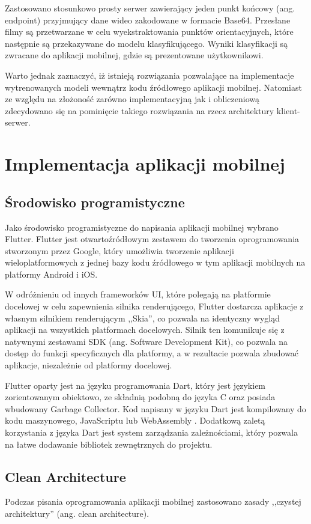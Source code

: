 Zastosowano stosunkowo prosty serwer zawierający jeden punkt końcowy (ang. endpoint) przyjmujący dane wideo zakodowane w formacie Base64.
Przesłane filmy są przetwarzane w celu wyekstraktowania punktów orientacyjnych, które następnie są przekazywane do modelu klasyfikującego. Wyniki klasyfikacji są zwracane do aplikacji mobilnej, gdzie są prezentowane użytkownikowi.

Warto jednak zaznaczyć, iż istnieją rozwiązania pozwalające na implementacje wytrenowanych modeli wewnątrz kodu źródłowego aplikacji mobilnej. 
Natomiast ze względu na złożoność zarówno implementacyjną jak i obliczeniową zdecydowano się na pominięcie takiego rozwiązania na rzecz architektury klient-serwer.


\section{Implementacja aplikacji mobilnej}
\subsection{Środowisko programistyczne}
Jako środowisko programistyczne do napisania aplikacji mobilnej wybrano Flutter. 
Flutter jest otwartoźródłowym zestawem do tworzenia oprogramowania stworzonym przez Google, który umożliwia tworzenie aplikacji wieloplatformowych z jednej bazy kodu źródłowego w tym aplikacji mobilnych na platformy Android i iOS.

W odróżnieniu od innych frameworków UI, które polegają na platformie docelowej w celu zapewnienia silnika renderującego, Flutter dostarcza aplikacje z własnym silnikiem renderującym ,,Skia'', co pozwala na identyczny wygląd aplikacji na wszystkich platformach docelowych.
Silnik ten komunikuje się z natywnymi zestawami SDK (ang. Software Development Kit), co pozwala na dostęp do funkcji specyficznych dla platformy, a w rezultacie pozwala zbudować aplikacje, niezależnie od platformy docelowej.


Flutter oparty jest na języku programowania Dart, który jest językiem zorientowanym obiektowo, ze składnią podobną do języka C oraz posiada wbudowany Garbage Collector.
Kod napisany w języku Dart jest kompilowany do kodu maszynowego, JavaScriptu lub WebAssembly \cite{dart_language_important_concepts}. 
Dodatkową zaletą korzystania z języka Dart jest system zarządzania zależnościami, który pozwala na łatwe dodawanie bibliotek zewnętrznych do projektu.

\subsection{Clean Architecture}
Podczas pisania oprogramowania aplikacji mobilnej zastosowano zasady ,,czystej architektury'' (ang. clean architecture).

